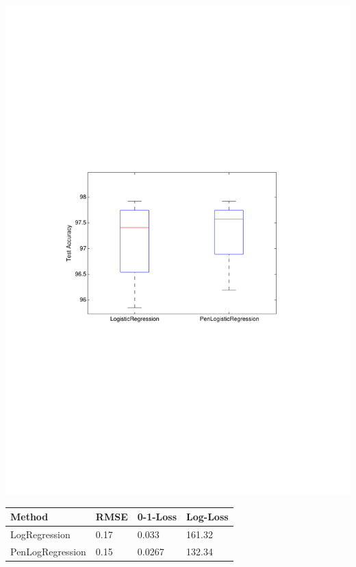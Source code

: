 \begin{minipage}{\textwidth}
  \begin{minipage}[b]{0.49\textwidth}
    \centering
    \includegraphics[clip, trim=4cm 10cm 3.5cm 10cm, width=\textwidth]{figures/comparison_LR_pLR.pdf}
    \label{fig:comp_LR_pLR}
  \end{minipage}
  \hfill
  \begin{minipage}[b]{0.49\textwidth}
    \centering
        \begin{tabular}{ | l | l | l | p{1.2cm} |}
    \hline
    Method & RMSE & 0-1-Loss & Log-Loss \\ \hline
    LogRegression & 0.17 & 0.033 & 161.32 \\ \hline
    PenLogRegression & 0.15 & 0.0267 & 132.34 \\ \hline
    \end{tabular}
      \label{table:test_errors}
      \par\vspace{60pt}
    \end{minipage}
  \end{minipage}
 
